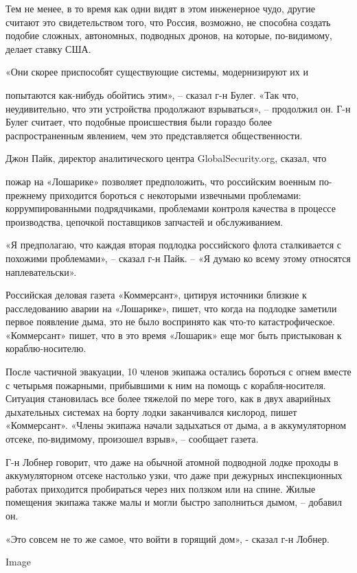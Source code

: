 Тем не менее, в то время как одни видят в этом инженерное чудо, другие
считают это свидетельством того, что Россия, возможно, не способна
создать подобие сложных, автономных, подводных дронов, на которые,
по-видимому, делает ставку США.

«Они скорее приспособят существующие системы, модернизируют их и

попытаются как-нибудь обойтись этим», -- сказал г-н Булег. «Так что,
неудивительно, что эти устройства продолжают взрываться», -- продолжил
он. Г-н Булег считает, что подобные происшествия были гораздо более
распространенным явлением, чем это представляется общественности.

Джон Пайк, директор аналитического центра GlobalSecurity.org, сказал,
что

пожар на «Лошарике» позволяет предположить, что российским военным
по-прежнему приходится бороться с некоторыми извечными проблемами:
коррумпированными подрядчиками, проблемами контроля качества в процессе
производства, цепочкой поставщиков запчастей и обслуживанием.

«Я предполагаю, что каждая вторая подлодка российского флота
сталкивается с похожими проблемами», -- сказал г-н Пайк. -- «Я думаю ко
всему этому относятся наплевательски».

Российская деловая газета «Коммерсант», цитируя источники близкие к
расследованию аварии на «Лошарике», пишет, что когда на подлодке
заметили первое появление дыма, это не было воспринято как что-то
катастрофическое. «Коммерсант» пишет, что в это время «Лошарик» еще мог
быть пристыкован к кораблю-носителю.

После частичной эвакуации, 10 членов экипажа остались бороться с огнем
вместе с четырьмя пожарными, прибывшими к ним на помощь с
корабля-носителя. Ситуация становилась все более тяжелой по мере того,
как в двух аварийных дыхательных системах на борту лодки заканчивался
кислород, пишет «Коммерсант». «Члены экипажа начали задыхаться от дыма,
а в аккумуляторном отсеке, по-видимому, произошел взрыв», -- сообщает
газета.

Г-н Лобнер говорит, что даже на обычной атомной подводной лодке проходы
в аккумуляторном отсеке настолько узки, что даже при дежурных
инспекционных работах приходится пробираться через них ползком или на
спине. Жилые помещения экипажа также малы и могли быстро заполниться
дымом, -- добавил он.

«Это совсем не то же самое, что войти в горящий дом», - сказал г-н
Лобнер.

Image


